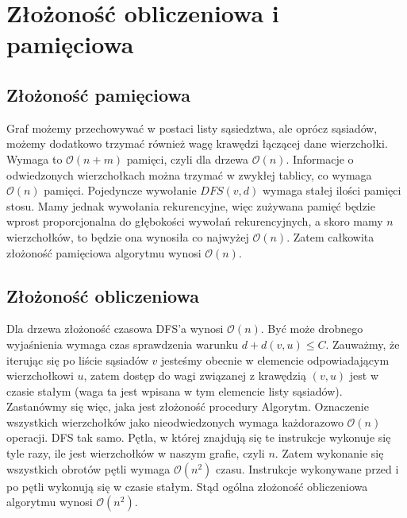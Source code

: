 \documentclass{article}
\begin{document}
\section{Złożoność obliczeniowa i pamięciowa}
\subsection{Złożoność pamięciowa}
Graf możemy przechowywać w postaci listy sąsiedztwa, ale oprócz sąsiadów, możemy dodatkowo trzymać również wagę krawędzi łączącej dane wierzchołki. Wymaga to $\mathcal{O}(n+m)$ pamięci, czyli dla drzewa $\mathcal{O}(n)$. Informacje o odwiedzonych wierzchołkach można trzymać w zwykłej tablicy, co wymaga $\mathcal{O}(n)$ pamięci. Pojedyncze wywołanie $DFS(v, d)$ wymaga stałej ilości pamięci stosu. Mamy jednak wywołania rekurencyjne, więc zużywana pamięć będzie wprost proporcjonalna do głębokości wywołań rekurencyjnych, a skoro mamy $n$ wierzchołków, to będzie ona wynosiła co najwyżej $\mathcal{O}(n)$. Zatem całkowita złożoność pamięciowa algorytmu wynosi $\mathcal{O}(n)$.

\subsection{Złożoność obliczeniowa}
Dla drzewa złożoność czasowa DFS'a wynosi $\mathcal{O}(n)$. Być może drobnego wyjaśnienia wymaga czas sprawdzenia warunku $d+d(v,u) \leq C$. Zauważmy, że iterując się po liście sąsiadów $v$ jesteśmy obecnie w elemencie odpowiadającym wierzchołkowi $u$, zatem dostęp do wagi związanej z krawędzią $(v, u)$ jest w czasie stałym (waga ta jest wpisana w tym elemencie listy sąsiadów). Zastanówmy się więc, jaka jest złożoność procedury Algorytm. Oznaczenie wszystkich wierzchołków jako nieodwiedzonych wymaga każdorazowo $\mathcal{O}(n)$ operacji. DFS tak samo. Pętla, w której znajdują się te instrukcje wykonuje się tyle razy, ile jest wierzchołków w naszym grafie, czyli $n$. Zatem wykonanie się wszystkich obrotów pętli wymaga $\mathcal{O}(n^2)$ czasu. Instrukcje wykonywane przed i po pętli wykonują się w czasie stałym. Stąd ogólna złożoność obliczeniowa algorytmu wynosi $\mathcal{O}(n^2)$.
\end{document}
